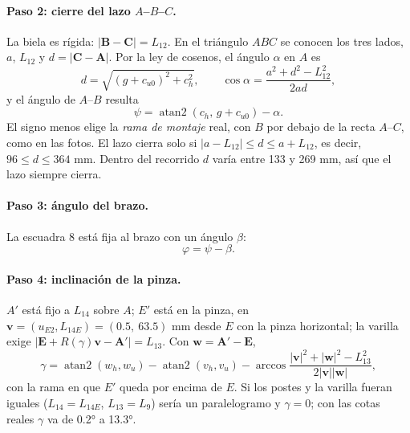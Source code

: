 \documentclass[a4paper,12pt]{article}
\begin{document}
\paragraph{Paso 2: cierre del lazo $A$--$B$--$C$.} La biela es rígida: $|\mathbf{B}-\mathbf{C}| = L_{12}$.
En el triángulo $A B C$ se conocen los tres lados, $a$, $L_{12}$ y $d = |\mathbf{C}-\mathbf{A}|$. Por la
ley de cosenos, el ángulo $\alpha$ en $A$ es
\begin{equation}
d = \sqrt{(g+c_{u0})^2 + c_h^2},\qquad \cos\alpha = \frac{a^2 + d^2 - L_{12}^2}{2ad},
\end{equation}
y el ángulo de $A$--$B$ resulta
\begin{equation}
\psi = \operatorname{atan2}(c_h,\, g + c_{u0}) - \alpha .
\label{eq:psi}
\end{equation}
El signo menos elige la \emph{rama de montaje} real, con $B$ por debajo de la recta $A$--$C$, como en las
fotos. El lazo cierra solo si $|a-L_{12}| \le d \le a+L_{12}$, es decir, $96 \le d \le 364$ mm. Dentro del
recorrido $d$ varía entre 133 y 269 mm, así que el lazo siempre cierra.

\paragraph{Paso 3: ángulo del brazo.} La escuadra 8 está fija al brazo con un ángulo $\beta$:
\begin{equation}
\varphi = \psi - \beta .
\end{equation}

\paragraph{Paso 4: inclinación de la pinza.} $A'$ está fijo a $L_{14}$ sobre $A$; $E'$ está en la pinza, en
$\mathbf{v} = (u_{E2}, L_{14E}) = (0.5,\ 63.5)$ mm desde $E$ con la pinza horizontal; la varilla exige
$|\mathbf{E} + R(\gamma)\mathbf{v} - \mathbf{A}'| = L_{13}$. Con $\mathbf{w} = \mathbf{A}' - \mathbf{E}$,
\begin{equation}
\gamma = \operatorname{atan2}(w_h, w_u) - \operatorname{atan2}(v_h, v_u)
       - \arccos\frac{|\mathbf{v}|^2 + |\mathbf{w}|^2 - L_{13}^2}{2|\mathbf{v}||\mathbf{w}|},
\label{eq:gamma}
\end{equation}
con la rama en que $E'$ queda por encima de $E$. Si los postes y la varilla fueran iguales ($L_{14} = L_{14E}$,
$L_{13} = L_9$) sería un paralelogramo y $\gamma = 0$; con las cotas reales $\gamma$ va de 0.2° a 13.3°.
\end{document}

